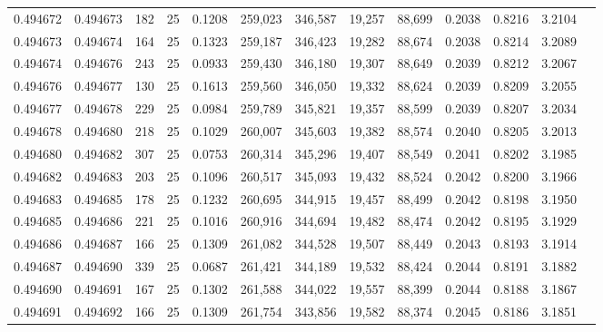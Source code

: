 \begin{tabular}{rrrrrrrrrrrrr}
0.494672 & 0.494673 &   182 &  25 &                                     0.1208 & 259,023 & 346,587 &  19,257 &  88,699 & 0.2038 & 0.8216 & 3.2104 \\
0.494673 & 0.494674 &   164 &  25 &                                     0.1323 & 259,187 & 346,423 &  19,282 &  88,674 & 0.2038 & 0.8214 & 3.2089 \\
0.494674 & 0.494676 &   243 &  25 &                                     0.0933 & 259,430 & 346,180 &  19,307 &  88,649 & 0.2039 & 0.8212 & 3.2067 \\
0.494676 & 0.494677 &   130 &  25 &                                     0.1613 & 259,560 & 346,050 &  19,332 &  88,624 & 0.2039 & 0.8209 & 3.2055 \\
0.494677 & 0.494678 &   229 &  25 &                                     0.0984 & 259,789 & 345,821 &  19,357 &  88,599 & 0.2039 & 0.8207 & 3.2034 \\
0.494678 & 0.494680 &   218 &  25 &                                     0.1029 & 260,007 & 345,603 &  19,382 &  88,574 & 0.2040 & 0.8205 & 3.2013 \\
0.494680 & 0.494682 &   307 &  25 &                                     0.0753 & 260,314 & 345,296 &  19,407 &  88,549 & 0.2041 & 0.8202 & 3.1985 \\
0.494682 & 0.494683 &   203 &  25 &                                     0.1096 & 260,517 & 345,093 &  19,432 &  88,524 & 0.2042 & 0.8200 & 3.1966 \\
0.494683 & 0.494685 &   178 &  25 &                                     0.1232 & 260,695 & 344,915 &  19,457 &  88,499 & 0.2042 & 0.8198 & 3.1950 \\
0.494685 & 0.494686 &   221 &  25 &                                     0.1016 & 260,916 & 344,694 &  19,482 &  88,474 & 0.2042 & 0.8195 & 3.1929 \\
0.494686 & 0.494687 &   166 &  25 &                                     0.1309 & 261,082 & 344,528 &  19,507 &  88,449 & 0.2043 & 0.8193 & 3.1914 \\
0.494687 & 0.494690 &   339 &  25 &                                     0.0687 & 261,421 & 344,189 &  19,532 &  88,424 & 0.2044 & 0.8191 & 3.1882 \\
0.494690 & 0.494691 &   167 &  25 &                                     0.1302 & 261,588 & 344,022 &  19,557 &  88,399 & 0.2044 & 0.8188 & 3.1867 \\
0.494691 & 0.494692 &   166 &  25 &                                     0.1309 & 261,754 & 343,856 &  19,582 &  88,374 & 0.2045 & 0.8186 & 3.1851 \\

\end{tabular}
